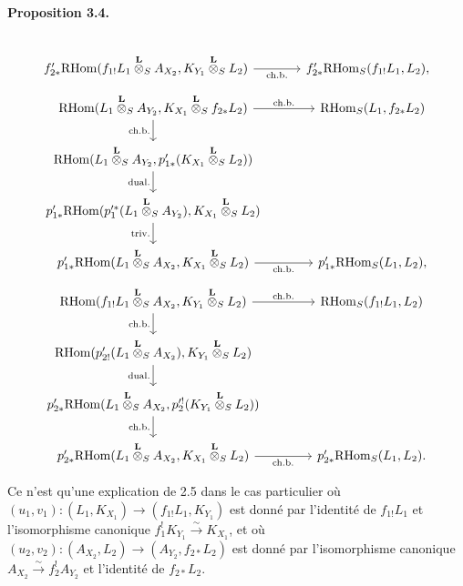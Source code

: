 \documentclass[11pt]{article}
\newenvironment{statement}[1]{\par\medskip\noindent\textbf{#1.}\ }{\par\medskip}
\providecommand{\RHom}{\mathrm{RHom}}
\providecommand{\RHom}{\mathrm{RHom}}
\providecommand{\RHom}{\mathrm R\mathcal{H}om}
\begin{document}
\begin{statement}{Proposition 3.4}
\[\begin{tikzcd}[column sep=3.7em,row sep=1.7em]
& \\
f'_{2*}\RHom(f_{1!}L_1\overset{\mathbf L}{\otimes}_S A_{X_2},K_{Y_1}\overset{\mathbf L}{\otimes}_S L_2) \arrow[r,"\mathrm{ch.b.}"']
& f'_{2*}\RHom_S(f_{1!}L_1,L_2),
\end{tikzcd}
\]
\[
\begin{tikzcd}[column sep=3.7em,row sep=1.7em]
\RHom(L_1\overset{\mathbf L}{\otimes}_S A_{Y_2},K_{X_1}\overset{\mathbf L}{\otimes}_S f_{2*}L_2)
  \arrow[r,"\mathrm{ch.b.}"] \arrow[d,"\mathrm{ch.b.}"']
& \RHom_S(L_1,f_{2*}L_2)  \\
\RHom(L_1\overset{\mathbf L}{\otimes}_S A_{Y_2},p'_{1*}(K_{X_1}\overset{\mathbf L}{\otimes}_S L_2)) \arrow[d,"\mathrm{dual.}"']
& \\
p'_{1*}\RHom(p_1'^*(L_1\overset{\mathbf L}{\otimes}_S A_{Y_2}),K_{X_1}\overset{\mathbf L}{\otimes}_S L_2) \arrow[d,"\mathrm{triv.}"']
& \\
p'_{1*}\RHom(L_1\overset{\mathbf L}{\otimes}_S A_{X_2},K_{X_1}\overset{\mathbf L}{\otimes}_S L_2) \arrow[r,"\mathrm{ch.b.}"']
& p'_{1*}\RHom_S(L_1,L_2),
\end{tikzcd}
\]
\[
\begin{tikzcd}[column sep=3.7em,row sep=1.7em]
\RHom(f_{1!}L_1\overset{\mathbf L}{\otimes}_S A_{X_2},K_{Y_1}\overset{\mathbf L}{\otimes}_S L_2)
  \arrow[r,"\mathrm{ch.b.}"] \arrow[d,"\mathrm{ch.b.}"']
& \RHom_S(f_{1!}L_1,L_2)  \\
\RHom(p'_{2!}(L_1\overset{\mathbf L}{\otimes}_S A_{X_2}),K_{Y_1}\overset{\mathbf L}{\otimes}_S L_2) \arrow[d,"\mathrm{dual.}"']
& \\
p'_{2*}\RHom(L_1\overset{\mathbf L}{\otimes}_S A_{X_2},p_2'^!(K_{Y_1}\overset{\mathbf L}{\otimes}_S L_2)) \arrow[d,"\mathrm{ch.b.}"']
& \\
p'_{2*}\RHom(L_1\overset{\mathbf L}{\otimes}_S A_{X_2},K_{X_1}\overset{\mathbf L}{\otimes}_S L_2) \arrow[r,"\mathrm{ch.b.}"']
& p'_{2*}\RHom_S(L_1,L_2).
\end{tikzcd}
\]
\end{statement}
Ce n'est qu'une explication de 2.5 dans le cas particulier où $(u_1,v_1):(L_1,K_{X_1})\to(f_{1!}L_1,K_{Y_1})$ est donné par l'identité de $f_{1!}L_1$ et l'isomorphisme canonique $f_1^!K_{Y_1}\xrightarrow{\sim}K_{X_1}$, et où $(u_2,v_2):(A_{X_2},L_2)\to(A_{Y_2},f_{2*}L_2)$ est donné par l'isomorphisme canonique $A_{X_2}\xrightarrow{\sim}f_2^!A_{Y_2}$ et l'identité de $f_{2*}L_2$.
\end{document}
